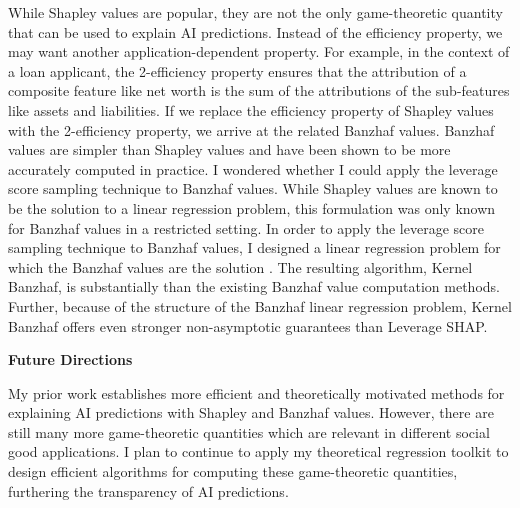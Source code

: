 \documentclass[11pt]{article}
\begin{document}
{While Shapley values are popular, they are not the only game-theoretic quantity that can be used to explain AI predictions.
Instead of the efficiency property, we may want another application-dependent property.
For example, in the context of a loan applicant, the 2-efficiency property ensures that the attribution of a composite feature like net worth is the sum of the attributions of the sub-features like assets and liabilities.
If we replace the efficiency property of Shapley values with the 2-efficiency property, we arrive at the related Banzhaf values.
Banzhaf values are simpler than Shapley values and have been shown to be more accurately computed in practice.
I wondered whether I could apply the leverage score sampling technique to Banzhaf values.
While Shapley values are known to be the solution to a linear regression problem, this formulation was only known for Banzhaf values in a restricted setting.
In order to apply the leverage score sampling technique to Banzhaf values, I designed a linear regression problem for which the Banzhaf values are the solution \cite{liu2024kernel}.
The resulting algorithm, Kernel Banzhaf, is substantially than the existing Banzhaf value computation methods.
Further, because of the structure of the Banzhaf linear regression problem, Kernel Banzhaf offers even stronger non-asymptotic guarantees than Leverage SHAP.

{ \large \textbf{Future Directions}}

My prior work establishes more efficient and theoretically motivated methods for explaining AI predictions with Shapley and Banzhaf values.
However, there are still many more game-theoretic quantities which are relevant in different social good applications.
I plan to continue to apply my theoretical regression toolkit to design efficient algorithms for computing these game-theoretic quantities, furthering the transparency of AI predictions.

}
\end{document}
